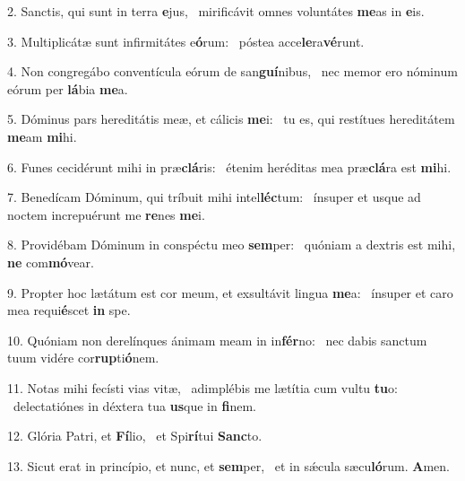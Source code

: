 2. Sanctis, qui sunt in terra \textbf{e}jus, \ast\  mirificávit omnes voluntátes \textbf{me}as in \textbf{e}is.\

3. Multiplicátæ sunt infirmitátes e\textbf{ó}rum: \ast\  póstea acce\textbf{le}ra\textbf{vé}runt.\

4. Non congregábo conventícula eórum de san\textbf{guí}nibus, \ast\  nec memor ero nóminum eórum per \textbf{lá}bia \textbf{me}a.\

5. Dóminus pars hereditátis meæ, et cálicis \textbf{me}i: \ast\  tu es, qui restítues hereditátem \textbf{me}am \textbf{mi}hi.\

6. Funes cecidérunt mihi in præ\textbf{clá}ris: \ast\  étenim heréditas mea præ\textbf{clá}ra est \textbf{mi}hi.\

7. Benedícam Dóminum, qui tríbuit mihi intel\textbf{léc}tum: \ast\  ínsuper et usque ad noctem increpuérunt me \textbf{re}nes \textbf{me}i.\

8. Providébam Dóminum in conspéctu meo \textbf{sem}per: \ast\  quóniam a dextris est mihi, \textbf{ne} com\textbf{mó}vear.\

9. Propter hoc lætátum est cor meum, et exsultávit lingua \textbf{me}a: \ast\  ínsuper et caro mea requi\textbf{é}scet \textbf{in} spe.\

10. Quóniam non derelínques ánimam meam in in\textbf{fér}no: \ast\  nec dabis sanctum tuum vidére cor\textbf{rup}ti\textbf{ó}nem.\

11. Notas mihi fecísti vias vitæ, \dag\  adimplébis me lætítia cum vultu \textbf{tu}o: \ast\  delectatiónes in déxtera tua \textbf{us}que in \textbf{fi}nem.\

12. Glória Patri, et \textbf{Fí}lio, \ast\  et Spi\textbf{rí}tui \textbf{Sanc}to.\

13. Sicut erat in princípio, et nunc, et \textbf{sem}per, \ast\  et in sǽcula sæcu\textbf{ló}rum. \textbf{A}men.\

